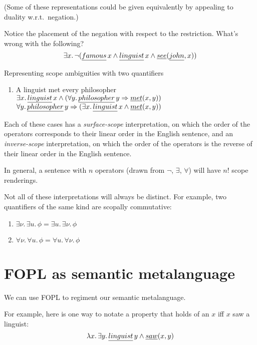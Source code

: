\documentclass{article}
\newcommand{\Ra}{\Rightarrow}
\begin{document}
(Some of these representations could be given equivalently by appealing to
duality w.r.t.~negation.)

Notice the placement of the negation with respect to the restriction. What's
wrong with the following?
\[\exists x.\, \neg(\emph{famous}\,x \wedge \emph{linguist}\,x \wedge
\emph{see}(\emph{john}, x))\]

Representing scope ambiguities with two quantifiers
\begin{enumerate}
  \item
    A linguist met every philosopher
    \\
    $\exists x.\, \emph{linguist}\,x \wedge (\forall y.\, \emph{philosopher}\,y
    \Ra \emph{met}(x, y))$
    \\
    $\forall y.\, \emph{philosopher}\,y \Ra (\exists x.\, \emph{linguist}\,x
  \wedge \emph{met}(x, y))$
\end{enumerate}

Each of these cases has a \emph{surface-scope} interpretation, on which the
order of the operators corresponds to their linear order in the English
sentence, and an \emph{inverse-scope} interpretation, on which the order of the
operators is the reverse of their linear order in the English sentence.

In general, a sentence with $n$ operators (drawn from $\neg$, $\exists$,
$\forall$) will have $n\text{!}$ scope renderings. 

Not all of these interpretations will always be distinct. For example, two
quantifiers of the same kind are scopally commutative:
\begin{enumerate}
  \item
    $\exists \nu.\, \exists u.\, \phi = \exists u.\, \exists
    \nu.\,\phi$
    
  \item
    $\forall \nu.\, \forall u.\, \phi = \forall u.\, \forall
    \nu.\,\phi$
\end{enumerate}


\section{FOPL as semantic metalanguage}

We can use FOPL to regiment our semantic metalanguage.

For example, here is one way to notate a property that holds of an $x$ iff $x$
saw a linguist:
\[\lambda x.\,\exists y.\,\emph{linguist}\,y \wedge \emph{saw}(x, y)\]
\end{document}
